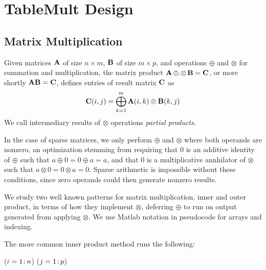 
\section{TableMult Design}
\label{sDesign}


\subsection{Matrix Multiplication}
\label{sMatMul}
Given matrices $\mathbf{A}$ of size $n \times m$, $\mathbf{B}$ of size $m \times p$,
and operations $\oplus$ and $\otimes$ for summation and multiplication,
the matrix product $\mathbf{A} \,{\oplus}.{\otimes}\, \mathbf{B} = \mathbf{C}$, or more shortly $\mathbf{A}\mathbf{B} = \mathbf{C}$,
defines entries of result matrix $\mathbf{C}$ as 
\[ \mathbf{C}(i,j) = \bigoplus_{k=1}^m \mathbf{A}(i,k) \otimes \mathbf{B}(k,j) \]
We call intermediary results of $\otimes$ operations \emph{partial products}.

In the case of sparse matrices, we only perform $\oplus$ and $\otimes$ where both operands are nonzero,
an optimization stemming from requiring that 0 is an additive identity of $\oplus$ such that $a \oplus 0 = 0 \oplus a = a$,
and that 0 is a multiplicative annhilator of $\otimes$ such that $a \otimes 0 = 0 \otimes a = 0$.
Sparse arithmetic is impossible without these conditions, since zero operands could then generate nonzero results.



We study two well known patterns for matrix multiplication,
inner and outer product, in terms of how they implement $\otimes$,
deferring $\oplus$ to run on output generated from applying $\otimes$.
We use Matlab notation in pseudocode for arrays and indexing.

The more common inner product method runs the following:

\removelatexerror
\begin{algorithm}[H]
\vspace{\algspace}
\fore($i = 1\colon\! n$){
\fore($j = 1\colon\! p$){
}}
\vspace{\algspace}
\end{algorithm}

